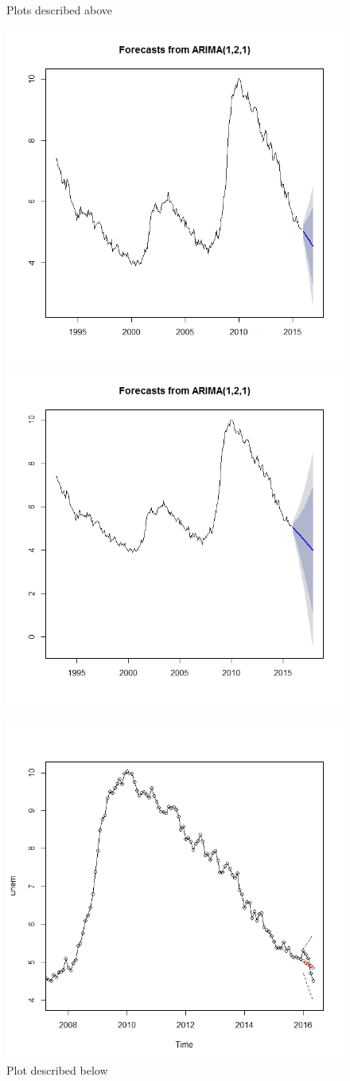 \documentclass[twoside,twocolumn]{article}
\begin{document}
  \begin{figure}[H]
    	\centering
     	\caption{Plots described above}
     	\includegraphics[width=.8\linewidth]{images/fore5}
     	\includegraphics[width=.7\linewidth]{images/fore6}
     	\caption{Plot described below}
     	\includegraphics[width=.7\linewidth]{images/fore7}
 \end{figure}
 
\end{document}
